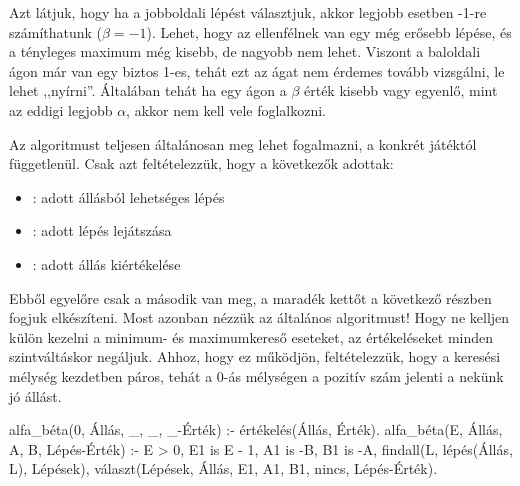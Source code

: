 \begin{center}
\end{center}

Azt látjuk, hogy ha a jobboldali lépést választjuk,
akkor legjobb esetben -1-re számíthatunk
($\beta=-1$). Lehet, hogy az ellenfélnek van egy még
erősebb lépése, és a tényleges maximum még kisebb,
de nagyobb nem lehet. Viszont a baloldali ágon már
van egy biztos 1-es, tehát ezt az ágat nem érdemes
tovább vizsgálni, le lehet ,,nyírni''. Általában
tehát ha egy ágon a $\beta$ érték kisebb vagy
egyenlő, mint az eddigi legjobb $\alpha$, akkor nem
kell vele foglalkozni.

Az algoritmust teljesen általánosan meg lehet
fogalmazni, a konkrét játéktól függetlenül. Csak azt
feltételezzük, hogy a következők adottak:
\begin{itemize}
\item {} : adott állásból
  lehetséges lépés
\item {} : adott lépés
  lejátszása
\item {} : adott állás
  kiértékelése
\end{itemize}

Ebből egyelőre csak a második van meg, a maradék
kettőt a következő részben fogjuk elkészíteni. Most
azonban nézzük az általános algoritmust! Hogy ne
kelljen külön kezelni a minimum- és maximumkereső
eseteket, az értékeléseket minden szintváltáskor
negáljuk. Ahhoz, hogy ez működjön, feltételezzük,
hogy a keresési mélység kezdetben páros, tehát a
0-ás mélységen a pozitív szám jelenti a nekünk jó
állást.

\begin{program}
alfa_béta(0, Állás, _, _, _-Érték) :-
    értékelés(Állás, Érték).
alfa_béta(E, Állás, A, B, Lépés-Érték) :-
    E > 0, E1 is E - 1,
    A1 is -B, B1 is -A,
    findall(L, lépés(Állás, L), Lépések),
    választ(Lépések, Állás, E1, A1, B1,
            nincs, Lépés-Érték).
\end{program}

